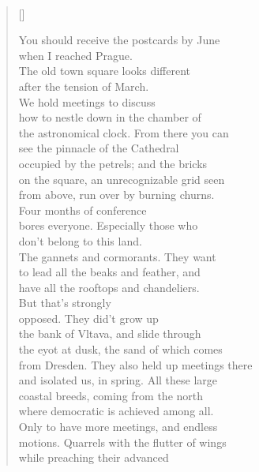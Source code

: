 \documentclass{book}
\begin{document}
\newpage
\poemtitle{\textcolor[RGB]{175,25,25}{The Alternative Spring}}
\hspace*{\fill} \\
\settowidth{\versewidth}{a sense for the direction. Our breed lived on this }
\begin{verse}[\versewidth]

    You should receive the postcards by June\\
    when I reached Prague. \\
    The old town square looks different\\
    after the tension of March. \\
    We hold meetings to discuss\\
    how to nestle down in the chamber of\\
    the astronomical clock. From there you can\\
    see the pinnacle of the Cathedral\\
    occupied by the petrels; and the bricks\\
    on the square, an unrecognizable grid seen\\
    from above, run over by burning churns. \\
    Four months of conference\\
    bores everyone. Especially those who \\
    don't belong to this land. \\
    The gannets and cormorants. They want\\
    to lead all the beaks and feather, and\\
    have all the rooftops and chandeliers. \\
    But that's strongly\\
    opposed. They did't grow up \\
    the bank of Vltava, and slide through\\
    the eyot at dusk, the sand of which comes\\
    from Dresden. They also held up meetings there\\
    and isolated us, in spring. All these large\\
    coastal breeds, coming from the north\\
    where democratic is achieved among all.\\
    Only to have more meetings, and endless\\
    motions. Quarrels with the flutter of wings\\
    while preaching their advanced\\

\end{verse}
\end{document}
